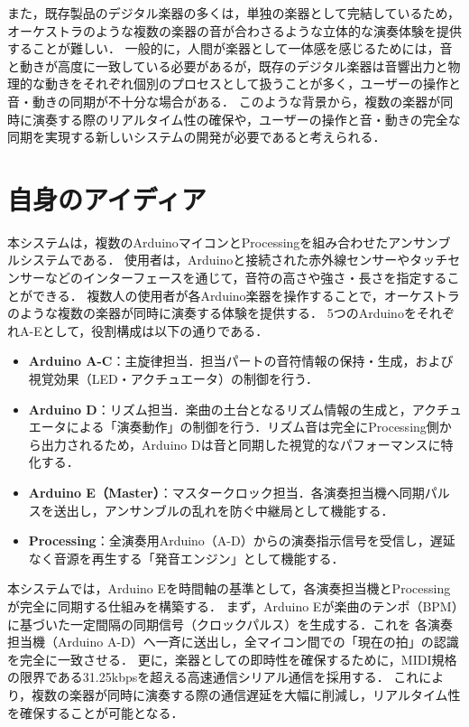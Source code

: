 \documentclass[uplatex,dvipdfmx]{jsarticle}
\begin{document}
また，既存製品のデジタル楽器の多くは，単独の楽器として完結しているため，オーケストラのような複数の楽器の音が合わさるような立体的な演奏体験を提供することが難しい．
一般的に，人間が楽器として一体感を感じるためには，音と動きが高度に一致している必要があるが，既存のデジタル楽器は音響出力と物理的な動きをそれぞれ個別のプロセスとして扱うことが多く，ユーザーの操作と音・動きの同期が不十分な場合がある\cite{levitin2000}．
このような背景から，複数の楽器が同時に演奏する際のリアルタイム性の確保や，ユーザーの操作と音・動きの完全な同期を実現する新しいシステムの開発が必要であると考えられる．

\section{自身のアイディア}
本システムは，複数のArduinoマイコンとProcessingを組み合わせたアンサンブルシステムである．
使用者は，Arduinoと接続された赤外線センサーやタッチセンサーなどのインターフェースを通じて，音符の高さや強さ・長さを指定することができる．
複数人の使用者が各Arduino楽器を操作することで，オーケストラのような複数の楽器が同時に演奏する体験を提供する．
5つのArduinoをそれぞれA-Eとして，役割構成は以下の通りである．

\begin{itemize}
    \item \textbf{Arduino A-C}：主旋律担当．担当パートの音符情報の保持・生成，および視覚効果（LED・アクチュエータ）の制御を行う．
    \item \textbf{Arduino D}：リズム担当．楽曲の土台となるリズム情報の生成と，アクチュエータによる「演奏動作」の制御を行う．リズム音は完全にProcessing側から出力されるため，Arduino Dは音と同期した視覚的なパフォーマンスに特化する．
    \item \textbf{Arduino E（Master）}：マスタークロック担当．各演奏担当機へ同期パルスを送出し，アンサンブルの乱れを防ぐ中継局として機能する．
    \item \textbf{Processing}：全演奏用Arduino（A-D）からの演奏指示信号を受信し，遅延なく音源を再生する「発音エンジン」として機能する．
\end{itemize}

本システムでは，Arduino Eを時間軸の基準として，各演奏担当機とProcessingが完全に同期する仕組みを構築する．
まず，Arduino Eが楽曲のテンポ（BPM）に基づいた一定間隔の同期信号（クロックパルス）を生成する．これを
各演奏担当機（Arduino A-D）へ一斉に送出し，全マイコン間での「現在の拍」の認識を完全に一致させる．
更に，楽器としての即時性を確保するために，MIDI規格の限界である31.25kbpsを超える高速通信シリアル通信を採用する．
これにより，複数の楽器が同時に演奏する際の通信遅延を大幅に削減し，リアルタイム性を確保することが可能となる．
\end{document}
